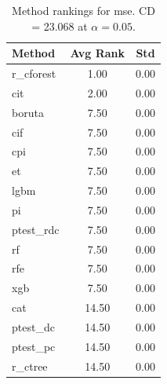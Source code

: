 \begin{table}[h]
\centering
\caption{Method rankings for mse. CD = 23.068 at $\alpha=0.05$.}
\label{tab:ranks_mse}
\begin{tabular}{lcc}
\toprule
Method & Avg Rank & Std \\
\midrule
r_cforest & 1.00 & 0.00 \\
cit & 2.00 & 0.00 \\
boruta & 7.50 & 0.00 \\
cif & 7.50 & 0.00 \\
cpi & 7.50 & 0.00 \\
et & 7.50 & 0.00 \\
lgbm & 7.50 & 0.00 \\
pi & 7.50 & 0.00 \\
ptest_rdc & 7.50 & 0.00 \\
rf & 7.50 & 0.00 \\
rfe & 7.50 & 0.00 \\
xgb & 7.50 & 0.00 \\
cat & 14.50 & 0.00 \\
ptest_dc & 14.50 & 0.00 \\
ptest_pc & 14.50 & 0.00 \\
r_ctree & 14.50 & 0.00 \\
\bottomrule
\end{tabular}
\end{table}